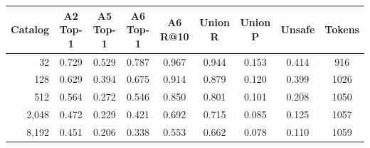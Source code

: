 \begin{tabular}{rcccccccc}
\toprule
Catalog & A2 Top-1 & A5 Top-1 & A6 Top-1 & A6 R@10 & Union R & Union P & Unsafe & Tokens \\
\midrule
32 & 0.729 & 0.529 & 0.787 & 0.967 & 0.944 & 0.153 & 0.414 & 916 \\
128 & 0.629 & 0.394 & 0.675 & 0.914 & 0.879 & 0.120 & 0.399 & 1026 \\
512 & 0.564 & 0.272 & 0.546 & 0.850 & 0.801 & 0.101 & 0.208 & 1050 \\
2,048 & 0.472 & 0.229 & 0.421 & 0.692 & 0.715 & 0.085 & 0.125 & 1057 \\
8,192 & 0.451 & 0.206 & 0.338 & 0.553 & 0.662 & 0.078 & 0.110 & 1059 \\
\bottomrule
\end{tabular}
